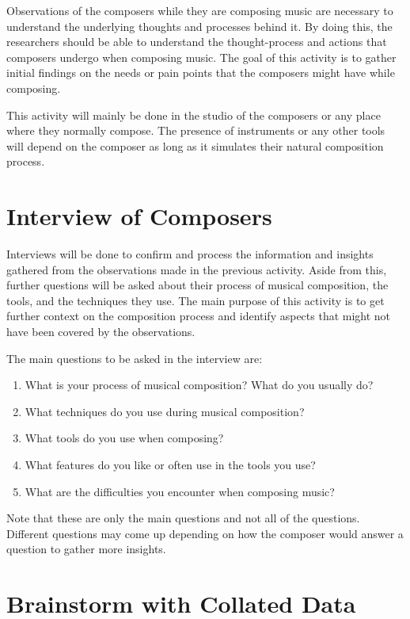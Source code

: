 		Observations of the composers while they are composing music are necessary to understand the underlying thoughts and processes behind it. By doing this, the researchers should be able to understand the thought-process and actions that composers undergo when composing music. The goal of this activity is to gather initial findings on the needs or pain points that the composers might have while composing. 

		This activity will mainly be done in the studio of the composers or any place where they normally compose. The presence of instruments or any other tools will depend on the composer as long as it simulates their natural composition process. 


	\section{Interview of Composers}

		Interviews will be done to confirm and process the information and insights gathered from the observations made in the previous activity. Aside from this, further questions will be asked about their process of musical composition, the tools, and the techniques they use. The main purpose of this activity is to get further context on the composition process and identify aspects that might not have been covered by the observations. 

		The main questions to be asked in the interview are: 
		\begin{enumerate}
			\item What is your process of musical composition? What do you usually do?
			\item What techniques do you use during musical composition?
			\item What tools do you use when composing?
			\item What features do you like or often use in the tools you use?
			\item What are the difficulties you encounter when composing music? 
		\end{enumerate}

		Note that these are only the main questions and not all of the questions. Different questions may come up depending on how the composer would answer a question to gather more insights. 

	\section{Brainstorm with Collated Data}

